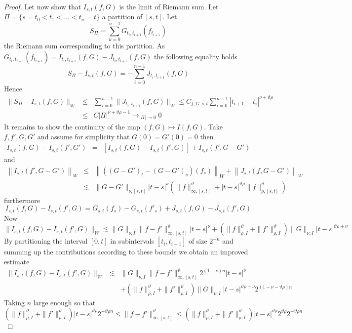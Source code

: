 \documentclass[11pt,a4paper,draft,reqno]{amsart}
\theoremstyle{definition}
\begin{document}
\begin{proof}
Let now show that $I_{s,t}(f,G)$ is the limit of Riemann sum. Let $\Pi=\{s=t_0<t_1<\dots<t_n=t\}$ a partition of $[s,t]$. Let
$$S_\Pi= \sum_{k=0}^{n-1} G_{t_i,t_{i+1}}(f_{t_{i+1}})$$
the Riemann sum corresponding to this partition.
As 
$G_{t_i,t_{i+1}}(f_{t_{i+1}})=I_{t_i,t_{i+1}}(f,G)-J_{t_i,t_{i+1}}(f,G)$
the following equality holds
$$S_\Pi - I_{s,t}(f,G) = - \sum_{i=0}^{n-1}J_{t_i,t_{i+1}}(f,G)$$
Hence
\begin{eqnarray*}
\|S_\Pi - I_{s,t}(f,G)\|_W
&\le&
\sum_{i=0}^{n-1}\|J_{t_i,t_{i+1}}(f,G)\|_W
\le
C_{f,G,s,t}\sum_{i=0}^{n-1}|t_{i+1}-t_i|^{\nu+\vartheta\rho}\\
&\le&
C|\Pi|^{\nu+\vartheta\rho-1}
\to_{|\Pi|\to0}
0
\end{eqnarray*}
It remains to show the continuity of the map $(f,G)\mapsto I(f,G)$. Take $f,f',G,G'$ and assume for simplicity that $G(0)=G'(0)=0$ then
\begin{eqnarray*}
I_{s,t}(f,G) - I_{s,t}(f',G') 
&=&
[I_{s,t}(f,G) - I_{s,t}(f',G)] + I_{s,t}(f',G-G') 
\end{eqnarray*}
and
\begin{eqnarray*}
\left\|I_{s,t}(f',G-G')\right\|_W
&\le&
\left\|\left((G-G')_t-(G-G')_s\right)(f_s)\right\|_W + \left\|J_{s,t}(f,G-G')\right\|_W\\
&\lesssim&
\|G-G'\|_{\nu,[s,t]}|t-s|^\nu\left(\|f\|^\vartheta_{\infty,[s,t]}+|t-s|^{\vartheta\rho}\|f\|^\vartheta_{\rho,[s,t]}\right)
\end{eqnarray*}
furthermore
$$
I_{s,t}(f,G) - I_{s,t}(f',G) = G_{s,t}(f_s) - G_{s,t}(f'_s) + J_{s,t}(f,G) - J_{s,t}(f',G)
$$
Now
$$
\|I_{s,t}(f,G) - I_{s,t}(f',G) \|_W \lesssim \|G\|_{\nu,I} \|f-f'\|^\vartheta_{\infty,[s,t]} |t-s|^{\nu} + (\|f\|^\vartheta_{\rho,I}+\|f'\|^\vartheta_{\rho,I})\|G\|_{\nu,I} |t-s|^{\vartheta\rho+\nu}
$$
By partitioning the interval $[0,t]$ in subintervals $[t_i,t_{i+1}]$ of size $2^{-n}$ and summing up the contributions according to these bounds we obtain an improved estimate
\begin{eqnarray*}
\|I_{s,t}(f,G) - I_{s,t}(f',G) \|_W 
&\lesssim& 
\|G\|_{\nu,I} \|f-f'\|^\vartheta_{\infty,[s,t]} 2^{(1-\nu)n} |t-s|^{\nu} \\
&&
+ (\|f\|^\vartheta_{\rho,I}+\|f'\|^\vartheta_{\rho,I})\|G\|_{\nu,I}  |t-s|^{\vartheta\rho+\nu} 2^{(1-\nu-\vartheta\rho)n}
\end{eqnarray*}
Taking $n$ large enough so that
$$
(\|f\|^\vartheta_{\rho,I}+\|f'\|^\vartheta_{\rho,I})  |t-s|^{\vartheta\rho} 2^{-\vartheta\rho n} \le  \|f-f'\|^\vartheta_{\infty,[s,t]} \le (\|f\|^\vartheta_{\rho,I}+\|f'\|^\vartheta_{\rho,I})  |t-s|^{\vartheta\rho} 2^{\vartheta\rho} 2^{-\vartheta\rho n}
$$
\end{proof}
\end{document}
